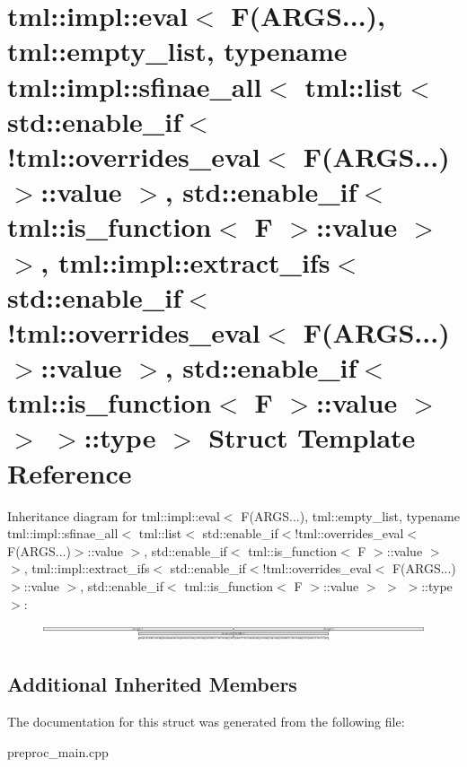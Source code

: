 \hypertarget{structtml_1_1impl_1_1eval_3_01F_07ARGS_8_8_8_08_00_01tml_1_1empty__list_00_01typename_01tml_1_1i819364f904a403ef529ebecf343aa847}{\section{tml\+:\+:impl\+:\+:eval$<$ F(A\+R\+G\+S...), tml\+:\+:empty\+\_\+list, typename tml\+:\+:impl\+:\+:sfinae\+\_\+all$<$ tml\+:\+:list$<$ std\+:\+:enable\+\_\+if$<$!tml\+:\+:overrides\+\_\+eval$<$ F(A\+R\+G\+S...)$>$\+:\+:value $>$, std\+:\+:enable\+\_\+if$<$ tml\+:\+:is\+\_\+function$<$ F $>$\+:\+:value $>$ $>$, tml\+:\+:impl\+:\+:extract\+\_\+ifs$<$ std\+:\+:enable\+\_\+if$<$!tml\+:\+:overrides\+\_\+eval$<$ F(A\+R\+G\+S...)$>$\+:\+:value $>$, std\+:\+:enable\+\_\+if$<$ tml\+:\+:is\+\_\+function$<$ F $>$\+:\+:value $>$ $>$ $>$\+:\+:type $>$ Struct Template Reference}
\label{structtml_1_1impl_1_1eval_3_01F_07ARGS_8_8_8_08_00_01tml_1_1empty__list_00_01typename_01tml_1_1i819364f904a403ef529ebecf343aa847}
}
Inheritance diagram for tml\+:\+:impl\+:\+:eval$<$ F(A\+R\+G\+S...), tml\+:\+:empty\+\_\+list, typename tml\+:\+:impl\+:\+:sfinae\+\_\+all$<$ tml\+:\+:list$<$ std\+:\+:enable\+\_\+if$<$!tml\+:\+:overrides\+\_\+eval$<$ F(A\+R\+G\+S...)$>$\+:\+:value $>$, std\+:\+:enable\+\_\+if$<$ tml\+:\+:is\+\_\+function$<$ F $>$\+:\+:value $>$ $>$, tml\+:\+:impl\+:\+:extract\+\_\+ifs$<$ std\+:\+:enable\+\_\+if$<$!tml\+:\+:overrides\+\_\+eval$<$ F(A\+R\+G\+S...)$>$\+:\+:value $>$, std\+:\+:enable\+\_\+if$<$ tml\+:\+:is\+\_\+function$<$ F $>$\+:\+:value $>$ $>$ $>$\+:\+:type $>$\+:\begin{figure}[H]
\begin{center}
\leavevmode
\includegraphics[height=0.455285cm]{structtml_1_1impl_1_1eval_3_01F_07ARGS_8_8_8_08_00_01tml_1_1empty__list_00_01typename_01tml_1_1i819364f904a403ef529ebecf343aa847}
\end{center}
\end{figure}
\subsection*{Additional Inherited Members}


The documentation for this struct was generated from the following file\+:\begin{DoxyCompactItemize}
\item 
preproc\+\_\+main.\+cpp\end{DoxyCompactItemize}
